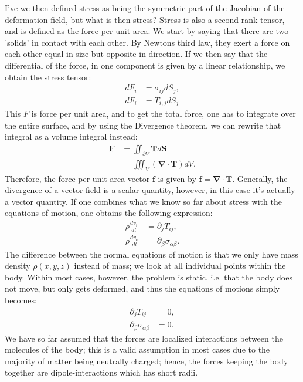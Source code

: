 \documentclass[a4paper]{article}
\newcommand{\dive}[1]{\mathbf{\nabla}\cdot \mathbf{#1}}
\begin{document}
\vspace*{0.5cm}\noindent
I've we then defined stress as being the symmetric part of the Jacobian of the deformation field, but what is then stress? 
Stress is also a second rank tensor, and is defined as the force per unit area. We start by saying that there are two 'solids' in contact with each other.
By Newtons third law, they exert a force on each other equal in size but opposite in direction. If we then say that the differential of the force, in one component is given by a linear relationship, we obtain the stress tensor:
\begin{align*}
    dF_i &= \sigma_{ij}dS_j,\\
    dF_i &= T_{i,j}dS_j
\end{align*}This $F$ is force per unit area, and to get the total force, one has to integrate over the entire surface, and by using the Divergence theorem, we can rewrite that integral as a volume integral instead:
\begin{align*}
    \mathbf{F} &= \iint_{\partial V}\mathbf{T}d\mathbf{S}\\
    &=\iiint_{V}\left(\dive{T}\right)dV.
\end{align*}Therefore, the force per unit area vector $\mathbf{f}$ is given by $\mathbf{f} = \dive{T}$. Generally, the divergence of a vector field is a scalar quantity, however, in this case it's actually a vector quantity.
If one combines what we know so far about stress with the equations of motion, one obtains the following expression:
\begin{align*}
    \rho\frac{d v_i}{dt} &=\partial_jT_{ij},\\
    \rho\frac{dv_\alpha}{dt} &= \partial_\beta\sigma_{\alpha\beta}.
\end{align*}The difference between the normal equations of motion is that we only have mass density $\rho(x,y,z)$ instead of mass; we look at all individual points within the body.
Within most cases, however, the problem is static, i.e. that the body does not move, but only gets deformed, and thus the equations of motions simply becomes:
\begin{align*}
    \partial_jT_{ij} &= 0,\\
    \partial_\beta\sigma_{\alpha\beta} &= 0.
\end{align*}We have so far assumed that the forces are localized interactions between the molecules of the body; this is a valid assumption in most cases due to the majority of matter being neutrally charged; hence, the forces keeping the body together are dipole-interactions which has short radii.
\end{document}
